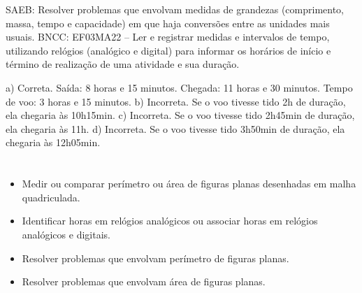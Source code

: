 \begin{escolha}
SAEB: Resolver problemas que envolvam medidas de grandezas (comprimento, massa, tempo e capacidade) em que haja conversões entre as unidades mais usuais. 
BNCC: EF03MA22 -- Ler e registrar medidas e intervalos de tempo, utilizando relógios (analógico e
digital) para informar os horários de início e término de realização de uma atividade e sua
duração.

a) Correta. Saída: 8 horas e 15 minutos. Chegada: 11 horas e 30 minutos. Tempo de voo: 3 horas e 15 minutos.
b) Incorreta. Se o voo tivesse tido 2h de duração, ela chegaria às 10h15min.
c) Incorreta. Se o voo tivesse tido 2h45min de duração, ela chegaria às 11h.
d) Incorreta. Se o voo tivesse tido 3h50min de duração, ela chegaria às 12h05min.


\chapter{}


\begin{itemize}
    \item Medir ou comparar perímetro ou área de figuras planas desenhadas em
malha quadriculada.

    \item Identificar horas em relógios analógicos ou associar horas em relógios
analógicos e digitais.

    \item Resolver problemas que envolvam perímetro de figuras planas.

    \item Resolver problemas que envolvam área de figuras planas.
\end{itemize}


\end{escolha}
